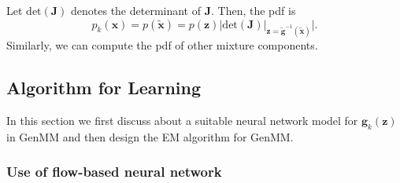 Let $\mathrm{det}(\bm{J})$ denotes the determinant of $\bm{J}$. Then, the pdf is
\begin{equation}\label{eq:sufficient-change-var}
  p_k(\bm{x}) = p(\tilde{\bm{x}}) =  p(\bm{z}) \bigg| \mathrm{det}(\bm{J}) \big|_{\bm{z}=\tilde{\bm{g}}^{-1}(\tilde{\bm{x}})}\bigg|.
\end{equation}
Similarly, we can compute the pdf of other mixture components.

\subsection{Algorithm for Learning}
In this section we first discuss about a suitable neural network model for $\bm{g}_k(\bm{z})$ in GenMM and then design the EM algorithm for GenMM. 

\subsubsection{Use of flow-based neural network}\label{subsec-flow-intro}

